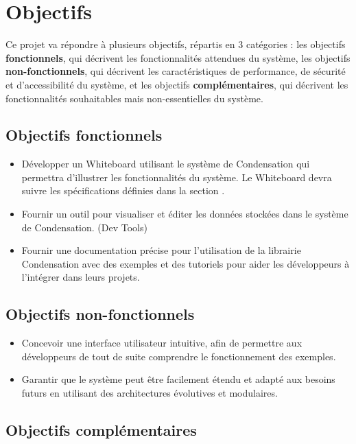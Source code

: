 \section*{Objectifs}
Ce projet va répondre à plusieurs objectifs, répartis en 3 catégories : les objectifs \textbf{fonctionnels}, qui décrivent les fonctionnalités attendues du système, les objectifs \textbf{non-fonctionnels}, qui décrivent les caractéristiques de performance, de sécurité et d'accessibilité du système, et les objectifs \textbf{complémentaires}, qui décrivent les fonctionnalités souhaitables mais non-essentielles du système.

\subsection*{Objectifs \guillemotleft fonctionnels\guillemotright}

\begin{itemize}
    \item Développer un Whiteboard utilisant le système de Condensation qui permettra d'illustrer les fonctionnalités du système. Le Whiteboard devra suivre les spécifications définies dans la section .
    \item Fournir un outil pour visualiser et éditer les données stockées dans le système de Condensation. (Dev Tools)
    \item Fournir une documentation précise pour l'utilisation de la librairie Condensation avec des exemples et des tutoriels pour aider les développeurs à l'intégrer dans leurs projets.
\end{itemize}

\subsection*{Objectifs \guillemotleft non-fonctionnels\guillemotright}

\begin{itemize}
    \item Concevoir une interface utilisateur intuitive, afin de permettre aux développeurs de tout de suite comprendre le fonctionnement des exemples.
    \item Garantir que le système peut être facilement étendu et adapté aux besoins futurs en utilisant des architectures évolutives et modulaires.
\end{itemize}

\subsection*{Objectifs \guillemotleft complémentaires\guillemotright}

